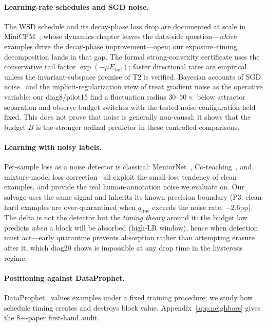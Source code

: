 \documentclass{article}
\newcommand{\B}{B}            %
\begin{document}
\paragraph{Learning-rate schedules and SGD noise.} The WSD schedule and its decay-phase loss
drop are documented at scale in MiniCPM~\citep{hu2024minicpm}, whose dynamics chapter leaves
the data-side question---\emph{which} examples drive the decay-phase improvement---open; our
exposure--timing decomposition lands in that gap. The formal strong-convexity certificate uses
the conservative tail factor $\exp(-\mu E_{\mathrm{tail}})$; faster directional rates are
empirical unless the invariant-subspace premise of T2 is verified. Bayesian accounts of SGD
noise~\citep{mandt2017sgd,smith2017bayesian} and the implicit-regularization view of
\citep{smith2021origin} treat gradient noise as the operative variable; our diag8/pilot15
find a fluctuation radius $30$--$50\times$ below attractor separation and observe budget switches
with the tested noise configuration held fixed. This does not prove that noise is generally
non-causal; it shows that the budget $\B$ is the stronger ordinal predictor in these controlled
comparisons.

\paragraph{Learning with noisy labels.} Per-sample loss as a noise detector is classical:
MentorNet~\citep{jiang2018mentornet}, Co-teaching~\citep{han2018coteaching}, and mixture-model
loss correction~\citep{arazo2019unsupervised} all exploit the small-loss tendency of clean
examples, and \citet{wei2022cifar10n} provide the real human-annotation noise we evaluate on.
Our salvage uses the same signal and inherits its known precision boundary (P3: clean hard
examples are over-quarantined when $q_{\text{frac}}$ exceeds the noise rate, $-2.6$pp). The
delta is not the detector but the \emph{timing theory} around it: the budget law predicts
\emph{when} a block will be absorbed (high-LR window), hence when detection must act---early
quarantine prevents absorption rather than attempting erasure after it, which diag20 shows is
impossible at any drop time in the hysteresis regime.

\paragraph{Positioning against DataProphet.} DataProphet~\citep{dataprophet2026} values examples
under a fixed training procedure; we study how schedule timing creates and destroys block value.
Appendix~\ref{app:neighbors} gives the 8+-paper first-hand audit.
\end{document}

